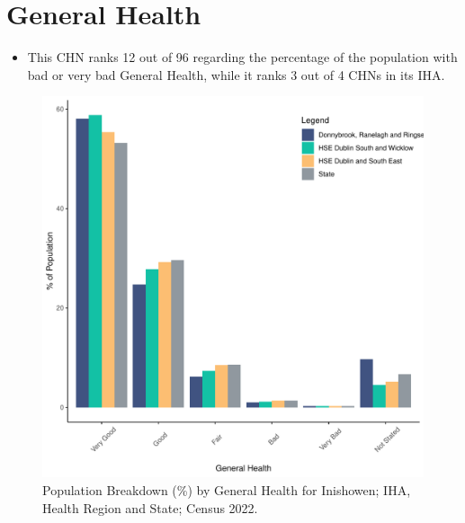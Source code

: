 \documentclass{article}
\begin{document}
\pagebreak

\section{General Health}\label{sect:GenHealth}
\begin{itemize}
\item  This CHN ranks  12 out of 96 regarding the percentage of the population with bad or very bad General Health, while it ranks   3 out of 4 CHNs in its IHA.
\end{itemize}
\begin{figure}[h]
	\centering
	\includegraphics[width = 150mm]{../figures/GenED.pdf}
	\caption{Population Breakdown (\%) by General Health for Inishowen; IHA, Health Region and State;  Census 2022.}
	\label{fig:2ae19629-1a6a-13a3-e055-000000000001}
	\end{figure}
\end{document}
